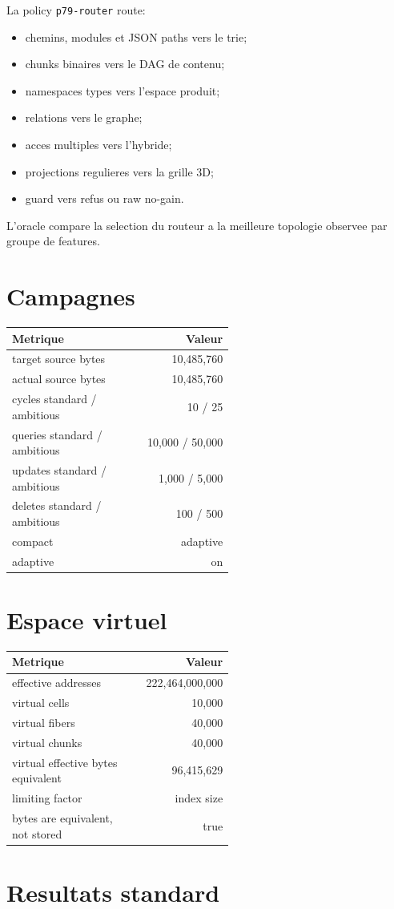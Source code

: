 \documentclass[a4paper,11pt]{article}
\newcommand{\Metric}[2]{#1 & #2\\}
\begin{document}
La policy \texttt{p79-router} route:
\begin{itemize}
  \item chemins, modules et JSON paths vers le trie;
  \item chunks binaires vers le DAG de contenu;
  \item namespaces types vers l'espace produit;
  \item relations vers le graphe;
  \item acces multiples vers l'hybride;
  \item projections regulieres vers la grille 3D;
  \item guard vers refus ou raw no-gain.
\end{itemize}

L'oracle compare la selection du routeur a la meilleure topologie observee par
groupe de features.

\section{Campagnes}

\begin{longtable}{@{}p{0.55\linewidth}r@{}}
\toprule
Metrique & Valeur\\
\midrule
\Metric{target source bytes}{10,485,760}
\Metric{actual source bytes}{10,485,760}
\Metric{cycles standard / ambitious}{10 / 25}
\Metric{queries standard / ambitious}{10,000 / 50,000}
\Metric{updates standard / ambitious}{1,000 / 5,000}
\Metric{deletes standard / ambitious}{100 / 500}
\Metric{compact}{adaptive}
\Metric{adaptive}{on}
\bottomrule
\end{longtable}

\section{Espace virtuel}

\begin{longtable}{@{}p{0.55\linewidth}r@{}}
\toprule
Metrique & Valeur\\
\midrule
\Metric{effective addresses}{222,464,000,000}
\Metric{virtual cells}{10,000}
\Metric{virtual fibers}{40,000}
\Metric{virtual chunks}{40,000}
\Metric{virtual effective bytes equivalent}{96,415,629}
\Metric{limiting factor}{index size}
\Metric{bytes are equivalent, not stored}{true}
\bottomrule
\end{longtable}

\section{Resultats standard}
\end{document}
